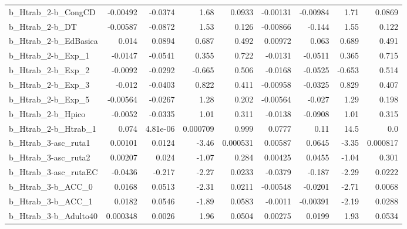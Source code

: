 \begin{tabular}{lrrrrrrrr}
b\_Htrab\_2-b\_CongCD         &    -0.00492 &      -0.0374 &      1.68 &   0.0933 &   -0.00131 &    -0.00984 &         1.71 &        0.0869 \\
b\_Htrab\_2-b\_DT             &    -0.00587 &      -0.0872 &      1.53 &    0.126 &   -0.00866 &      -0.144 &         1.55 &         0.122 \\
b\_Htrab\_2-b\_EdBasica       &       0.014 &       0.0894 &     0.687 &    0.492 &    0.00972 &       0.063 &        0.689 &         0.491 \\
b\_Htrab\_2-b\_Exp\_1          &     -0.0147 &      -0.0541 &     0.355 &    0.722 &    -0.0131 &     -0.0511 &        0.365 &         0.715 \\
b\_Htrab\_2-b\_Exp\_2          &     -0.0092 &      -0.0292 &    -0.665 &    0.506 &    -0.0168 &     -0.0525 &       -0.653 &         0.514 \\
b\_Htrab\_2-b\_Exp\_3          &      -0.012 &      -0.0403 &     0.822 &    0.411 &   -0.00958 &     -0.0325 &        0.829 &         0.407 \\
b\_Htrab\_2-b\_Exp\_5          &    -0.00564 &      -0.0267 &      1.28 &    0.202 &   -0.00564 &      -0.027 &         1.29 &         0.198 \\
b\_Htrab\_2-b\_Hpico          &     -0.0052 &      -0.0335 &      1.01 &    0.311 &    -0.0138 &     -0.0908 &         1.01 &         0.315 \\
b\_Htrab\_2-b\_Htrab\_1        &       0.074 &     4.81e-06 &  0.000709 &    0.999 &     0.0777 &        0.11 &         14.5 &           0.0 \\
b\_Htrab\_3-asc\_ruta1        &     0.00101 &       0.0124 &     -3.46 & 0.000531 &    0.00587 &      0.0645 &        -3.35 &      0.000817 \\
b\_Htrab\_3-asc\_ruta2        &     0.00207 &        0.024 &     -1.07 &    0.284 &    0.00425 &      0.0455 &        -1.04 &         0.301 \\
b\_Htrab\_3-asc\_rutaEC       &     -0.0436 &       -0.217 &     -2.27 &   0.0233 &    -0.0379 &      -0.187 &        -2.29 &        0.0222 \\
b\_Htrab\_3-b\_ACC\_0          &      0.0168 &       0.0513 &     -2.31 &   0.0211 &   -0.00548 &     -0.0201 &        -2.71 &        0.0068 \\
b\_Htrab\_3-b\_ACC\_1          &      0.0182 &       0.0546 &     -1.89 &   0.0583 &    -0.0011 &    -0.00391 &        -2.19 &        0.0288 \\
b\_Htrab\_3-b\_Adulto40       &    0.000348 &       0.0026 &      1.96 &   0.0504 &    0.00275 &      0.0199 &         1.93 &        0.0534 \\

\end{tabular}
